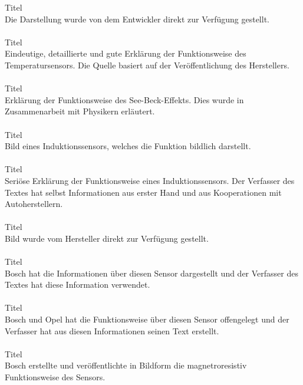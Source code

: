 Titel \cite{TS_temp_pic}\\
Die Darstellung wurde von dem Entwickler direkt zur Verfügung gestellt.\\\\

Titel \cite{TS_temp}\\
Eindeutige, detaillierte und gute Erklärung der Funktionsweise des Temperatursensors. Die Quelle basiert auf der Veröffentlichung des Herstellers. \\\\

Titel \cite{TS_see_beck}\\
Erklärung der Funktionsweise des See-Beck-Effekts. Dies wurde in Zusammenarbeit mit Physikern erläutert.\\\\

Titel \cite{TS_ind_sensor}\\
Bild eines Induktionssensors, welches die Funktion bildlich darstellt.\\\\

Titel \cite{TS_ind_funkt}\\
Seriöse Erklärung der Funktionsweise eines Induktionssensors. Der Verfasser des Textes hat selbst Informationen aus erster Hand und aus Kooperationen mit Autoherstellern. \\\\

Titel \cite{TS_ind_funkt_pic}\\
Bild wurde vom Hersteller direkt zur Verfügung gestellt. \\\\

Titel \cite{TS_oel}\\
Bosch hat die Informationen über diesen Sensor dargestellt und der Verfasser des Textes hat diese Information verwendet.\\\\

Titel \cite{TS_dreh}\\
Bosch und Opel hat die Funktionsweise über diesen Sensor offengelegt und der Verfasser hat aus diesen Informationen seinen Text erstellt.\\\\

Titel \cite{TS_dreh_pic_mag}\\
Bosch erstellte und veröffentlichte in Bildform die magnetroresistiv Funktionsweise des Sensors.\\\\

